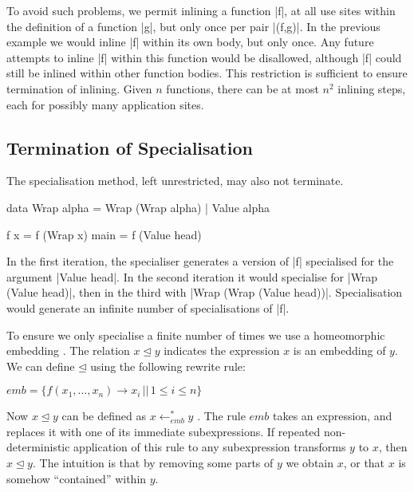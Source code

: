 \documentclass[preprint]{sigplanconf}
\begin{document}
To avoid such problems, we permit inlining a function |f|, at all use sites within the definition of a function |g|, but only once per pair |(f,g)|. In the previous example we would inline |f| within its own body, but only once. Any future attempts to inline |f| within this function would be disallowed, although |f| could still be inlined within other function bodies. This restriction is sufficient to ensure termination of inlining. Given $n$ functions, there can be at most $n^2$ inlining steps, each for possibly many application sites.


\subsection{Termination of Specialisation}
\label{sec:termination_specialisation}

The specialisation method, left unrestricted, may also not terminate.

\begin{example}
\label{ex:wrap}
\begin{code}
data Wrap alpha = Wrap (Wrap alpha) | Value alpha

f x = f (Wrap x)
main = f (Value head)
\end{code}

In the first iteration, the specialiser generates a version of |f| specialised for the argument |Value head|. In the second iteration it would specialise for |Wrap (Value head)|, then in the third with |Wrap (Wrap (Value head))|. Specialisation would generate an infinite number of specialisations of |f|.
\end{example}

To ensure we only specialise a finite number of times we use a homeomorphic embedding \cite{leuschel:homeomorphic}. The relation $x \unlhd y$ indicates the expression $x$ is an embedding of $y$. We can define $\unlhd$ using the following rewrite rule:

\begin{center}
$\mathit{emb} = \{f(x_1,\dots,x_n) \rightarrow x_i \, || \, 1 \leq i \leq n\}$
\end{center}

Now $x \unlhd y$ can be defined as $x \leftarrow^*_{\mathit{emb}} y$ \cite{term_rewriting}. The rule $\mathit{emb}$ takes an expression, and replaces it with one of its immediate subexpressions. If repeated non-deterministic application of this rule to any subexpression transforms $y$ to $x$, then $x \unlhd y$. The intuition is that by removing some parts of $y$ we obtain $x$, or that $x$ is somehow ``contained'' within $y$.
\end{document}
